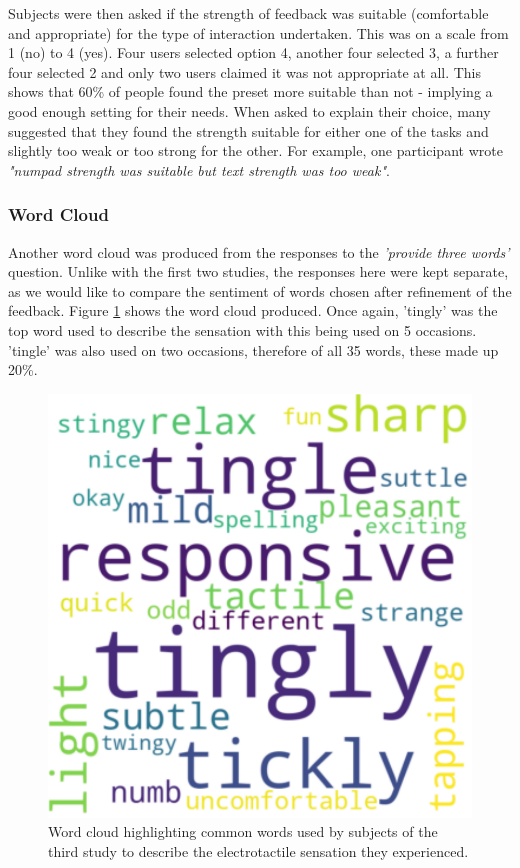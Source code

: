 \documentclass{mpaper}
\begin{document}
Subjects were then asked if the strength of feedback was suitable (comfortable and appropriate) for the type of interaction undertaken. This was on a scale from 1 (no) to 4 (yes). Four users selected option 4, another four selected 3, a further four selected 2 and only two users claimed it was not appropriate at all. This shows that 60\% of people found the preset more suitable than not - implying a good enough setting for their needs. When asked to explain their choice, many suggested that they found the strength suitable for either one of the tasks and slightly too weak or too strong for the other. For example, one participant wrote \emph{"numpad strength was suitable but text strength was too weak"}.

\subsubsection{Word Cloud}\label{subsubser:word-cloud-3}
Another word cloud was produced from the responses to the \emph{'provide three words'} question. Unlike with the first two studies, the responses here were kept separate, as we would like to compare the sentiment of words chosen after refinement of the feedback. Figure \ref{fig:wordcloud-3} shows the word cloud produced. Once again, 'tingly' was the top word used to describe the sensation with this being used on 5 occasions. 'tingle' was also used on two occasions, therefore of all 35 words, these made up 20\%.

\begin{figure}
    \centering
    \includegraphics[scale=0.4]{images/Wordcloud-3.pdf}
    \caption{Word cloud highlighting common words used by subjects of the third study to describe the electrotactile sensation they experienced. }
    \label{fig:wordcloud-3}
\end{figure}
\end{document}
